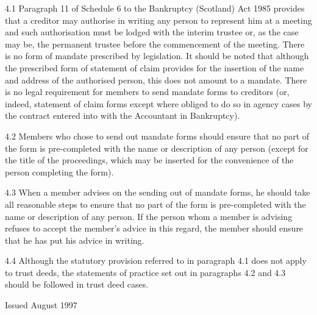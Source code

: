 \documentclass[11pt,a4paper]{article}
\begin{document}
4.1	Paragraph 11 of Schedule 6 to the Bankruptcy (Scotland) Act 1985 provides that a creditor may authorise in writing any person to represent him at a meeting and such authorisation must be lodged with the interim trustee or, as the case may be, the permanent trustee before the commencement of the meeting.  There is no form of mandate prescribed by legislation.  It should be noted that although the prescribed form of statement of claim provides for the insertion of the name and address of the authorised person, this does not amount to a mandate.  There is no legal requirement for members to send mandate forms to creditors (or, indeed, statement of claim forms except where obliged to do so in agency cases by the contract entered into with the Accountant in Bankruptcy).

4.2	Members who chose to send out mandate forms should ensure that no part of the form is pre-completed with the name or description of any person (except for the title of the proceedings, which may be inserted for the convenience of the person completing the form).

4.3	When a member advises on the sending out of mandate forms, he should take all reasonable steps to ensure that no part of the form is pre-completed with the name or description of any person.  If the person whom a member is advising refuses to accept the member’s advice in this regard, the member should ensure that he has put his advice in writing.

4.4	Although the statutory provision referred to in paragraph 4.1 does not apply to trust deeds, the statements of practice set out in paragraphs 4.2 and 4.3 should be followed in trust deed cases.

Issued August 1997
\end{document}
